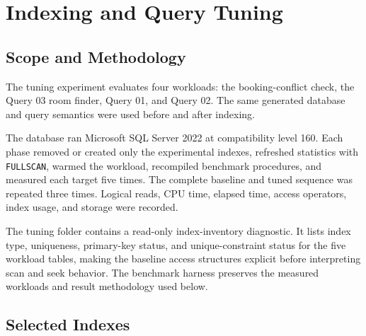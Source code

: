\section{Indexing and Query Tuning}

\subsection{Scope and Methodology}

The tuning experiment evaluates four workloads: the booking-conflict check, the Query 03 room finder, Query 01, and Query 02. The same generated database and query semantics were used before and after indexing.

The database ran Microsoft SQL Server 2022 at compatibility level 160. Each phase removed or created only the experimental indexes, refreshed statistics with \texttt{FULLSCAN}, warmed the workload, recompiled benchmark procedures, and measured each target five times. The complete baseline and tuned sequence was repeated three times. Logical reads, CPU time, elapsed time, access operators, index usage, and storage were recorded.

The tuning folder contains a read-only index-inventory diagnostic. It lists index type, uniqueness, primary-key status, and unique-constraint status for the five workload tables, making the baseline access structures explicit before interpreting scan and seek behavior. The benchmark harness preserves the measured workloads and result methodology used below.

\subsection{Selected Indexes}

